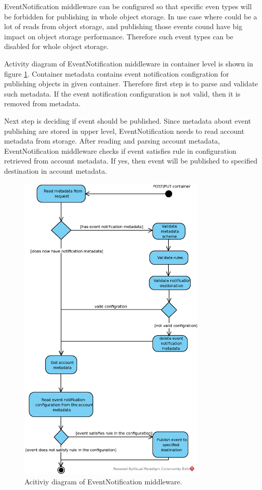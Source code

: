     EventNotification middleware can be configured so that specific even types will be forbidden for publishing in whole object storage. In use case where could be a lot of reads from object storage, and publishing those events cound have big impact on object storage performance. Therefore such event types can be disabled for whole object storage.

    Activity diagram of EventNotification middleware in container level is shown in figure \ref{fig:middlewareActivity}. Container metadata contains event notification configration for publishing objects in given container. Therefore first step is to parse and validate such metadata. If the event notification configuration is not valid, then it is removed from metadata.

    Next step is deciding if event should be published. Since metadata about event publishing are stored in upper level, EventNotification needs to read account metadata from storage. After reading and parsing account metadata, EventNotification middleware checks if event satisfies rule in configuration retrieved from account metadata. If yes, then event will be published to specified destination in account metadata.

    \begin{figure}[hbt]
        \centering
        \includegraphics[width=0.8\textwidth]{obrazky-figures/middleware-activity-diagram.eps}
        \caption{Acitiviy diagram of EventNotification middleware.}
        \label{fig:middlewareActivity}
    \end{figure}

